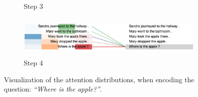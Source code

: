 \begin{figure}[!h]
\begin{minipage}{\textwidth}
\begin{subfigure}[t]{\textwidth}
        \caption{Step 3}
    \end{subfigure}
    \hfill \hfill 
    \begin{subfigure}[t]{\textwidth}
        \centering
        \includegraphics[height=0.8in]{04-part-03/chapter-06/figs_and_tables/figs_attention_babi/e2-step4}
        \caption{Step 4}
    \end{subfigure}
    \end{minipage}
    \caption{Visualization of the attention distributions, when encoding the question: \emph{``Where is the apple?''}.}
\end{figure}

\afterpage{\clearpage}


